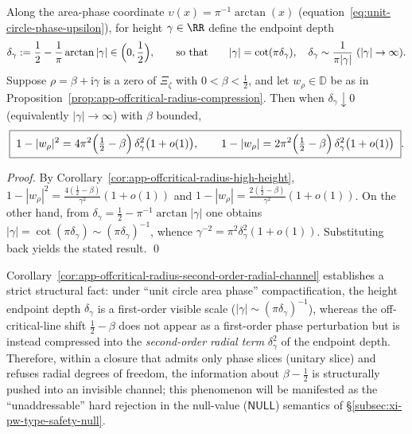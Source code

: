 \begin{corollary}\label{cor:app-offcritical-radius-second-order-radial-channel}
Along the area-phase coordinate \(\upsilon(x)=\pi^{-1}\arctan(x)\) (equation~\eqref{eq:unit-circle-phase-upsilon}), for height \(\gamma\in\RR\) define the endpoint depth
\[
\delta_{\gamma}:=\frac12-\frac{1}{\pi}\arctan|\gamma|\in\Bigl(0,\frac12\Bigr),
\qquad\text{so that}\qquad
|\gamma|=\cot(\pi\delta_{\gamma}),\quad \delta_{\gamma}\sim\frac{1}{\pi|\gamma|}\ (|\gamma|\to\infty).
\]
Suppose \(\rho=\beta+\mathrm{i}\gamma\) is a zero of \(\Xi_{\zeta}\) with \(0<\beta<\frac12\), and let \(w_{\rho}\in\mathbb{D}\) be as in Proposition~\ref{prop:app-offcritical-radius-compression}.
Then when \(\delta_{\gamma}\downarrow 0\) (equivalently \(|\gamma|\to\infty\)) with \(\beta\) bounded,
\[
\boxed{\;
1-|w_{\rho}|^{2}
=
4\pi^{2}\Bigl(\tfrac12-\beta\Bigr)\,\delta_{\gamma}^{2}\bigl(1+o(1)\bigr),
\qquad
1-|w_{\rho}|
=
2\pi^{2}\Bigl(\tfrac12-\beta\Bigr)\,\delta_{\gamma}^{2}\bigl(1+o(1)\bigr)\; }.
\]
\end{corollary}
\begin{proof}
By Corollary~\ref{cor:app-offcritical-radius-high-height},
\(
1-|w_{\rho}|^{2}=\frac{4(\tfrac12-\beta)}{\gamma^{2}}(1+o(1))
\)
and \(1-|w_{\rho}|=\frac{2(\tfrac12-\beta)}{\gamma^{2}}(1+o(1))\).
On the other hand, from \(\delta_{\gamma}=\frac12-\pi^{-1}\arctan|\gamma|\) one obtains \(|\gamma|=\cot(\pi\delta_{\gamma})\sim(\pi\delta_{\gamma})^{-1}\), whence \(\gamma^{-2}=\pi^{2}\delta_{\gamma}^{2}(1+o(1))\).
Substituting back yields the stated result. \qed
\end{proof}

\begin{remark}\label{rem:app-offcritical-second-order-radial-suppression}
Corollary~\ref{cor:app-offcritical-radius-second-order-radial-channel} establishes a strict structural fact: under ``unit circle area phase'' compactification, the height endpoint depth \(\delta_{\gamma}\) is a first-order visible scale (\(|\gamma|\sim(\pi\delta_{\gamma})^{-1}\)), whereas the off-critical-line shift \(\tfrac12-\beta\) does not appear as a first-order phase perturbation but is instead compressed into the \emph{second-order radial term} \(\delta_{\gamma}^{2}\) of the endpoint depth.
Therefore, within a closure that admits only phase slices (unitary slice) and refuses radial degrees of freedom, the information about \(\beta-\tfrac12\) is structurally pushed into an invisible channel; this phenomenon will be manifested as the ``unaddressable'' hard rejection in the null-value (\(\mathsf{NULL}\)) semantics of \S\ref{subsec:xi-pw-type-safety-null}.
\end{remark}

